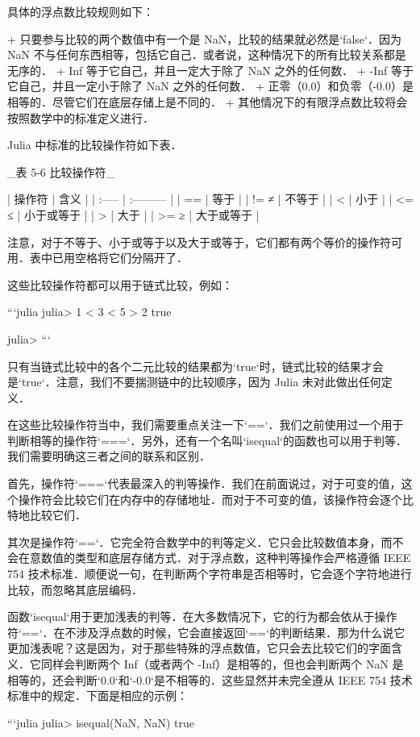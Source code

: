具体的浮点数比较规则如下：

+ 只要参与比较的两个数值中有一个是 NaN，比较的结果就必然是`false`．因为 NaN 不与任何东西相等，包括它自己．或者说，这种情况下的所有比较关系都是无序的．
+ Inf 等于它自己，并且一定大于除了 NaN 之外的任何数．
+ -Inf 等于它自己，并且一定小于除了 NaN 之外的任何数．
+ 正零（0.0）和负零（-0.0）是相等的．尽管它们在底层存储上是不同的．
+ 其他情况下的有限浮点数比较将会按照数学中的标准定义进行．

Julia 中标准的比较操作符如下表．

_表 5-6 比较操作符_

| 操作符 | 含义       |
| :----- | :--------- |
| ==     | 等于       |
| != ≠   | 不等于     |
| <      | 小于       |
| <= ≤   | 小于或等于 |
| >      | 大于       |
| >= ≥   | 大于或等于 |

注意，对于不等于、小于或等于以及大于或等于，它们都有两个等价的操作符可用．表中已用空格将它们分隔开了．

这些比较操作符都可以用于链式比较，例如：

```julia
julia> 1 < 3 < 5 > 2
true

julia> 
```

只有当链式比较中的各个二元比较的结果都为`true`时，链式比较的结果才会是`true`．注意，我们不要揣测链中的比较顺序，因为 Julia 未对此做出任何定义．

在这些比较操作符当中，我们需要重点关注一下`==`．我们之前使用过一个用于判断相等的操作符`===`．另外，还有一个名叫`isequal`的函数也可以用于判等．我们需要明确这三者之间的联系和区别．

首先，操作符`===`代表最深入的判等操作．我们在前面说过，对于可变的值，这个操作符会比较它们在内存中的存储地址．而对于不可变的值，该操作符会逐个比特地比较它们．

其次是操作符`==`．它完全符合数学中的判等定义．它只会比较数值本身，而不会在意数值的类型和底层存储方式．对于浮点数，这种判等操作会严格遵循 IEEE 754 技术标准．顺便说一句，在判断两个字符串是否相等时，它会逐个字符地进行比较，而忽略其底层编码．

函数`isequal`用于更加浅表的判等．在大多数情况下，它的行为都会依从于操作符`==`．在不涉及浮点数的时候，它会直接返回`==`的判断结果．那为什么说它更加浅表呢？这是因为，对于那些特殊的浮点数值，它只会去比较它们的字面含义．它同样会判断两个 Inf（或者两个 -Inf）是相等的，但也会判断两个 NaN 是相等的，还会判断`0.0`和`-0.0`是不相等的．这些显然并未完全遵从 IEEE 754 技术标准中的规定．下面是相应的示例：

```julia
julia> isequal(NaN, NaN)
true

